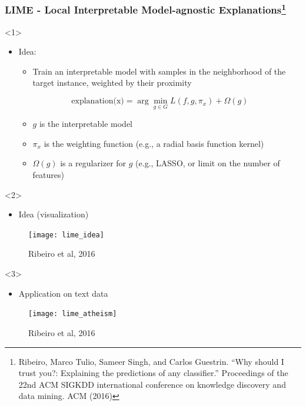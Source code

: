 \begin{frame}
  \frametitle{LIME - Local Interpretable Model-agnostic
    Explanations\footnote{Ribeiro, Marco Tulio, Sameer Singh, and Carlos
    Guestrin. ``Why should I trust you?: Explaining the predictions of any
    classifier.'' Proceedings of the 22nd ACM SIGKDD international conference
    on knowledge discovery and data mining. ACM (2016)}}
  \begin{onlyenv}<1>
    \begin{itemize}
    \item Idea:
      \begin{itemize}
      \item Train an interpretable model with samples in the neighborhood of the
        target instance, weighted by their proximity
      \end{itemize}
      \begin{equation*}
        \text{explanation(x)} = \arg\min\limits_{g\in G}L(f, g, \pi_x) + \Omega(g)
      \end{equation*}
      \begin{itemize}
      \item $g$ is the interpretable model
      \item $\pi_x$ is the weighting function (e.g., a radial basis function
        kernel)
      \item $\Omega(g)$ is a regularizer for $g$ (e.g., LASSO, or limit on the
        number of features)
      \end{itemize}
    \end{itemize}
  \end{onlyenv}
  \begin{onlyenv}<2>
    \begin{itemize}
    \item Idea (visualization)
    \end{itemize}
    \begin{figure}
      \texttt{[image: lime\_idea]}
      \caption{\footnotesize Ribeiro et al, 2016}
    \end{figure}
  \end{onlyenv}
  \begin{onlyenv}<3>
    \begin{itemize}
    \item Application on text data
    \end{itemize}
    \begin{figure}
      \texttt{[image: lime\_atheism]}
      \caption{\footnotesize Ribeiro et al, 2016}
    \end{figure}
  \end{onlyenv}
\end{frame}

